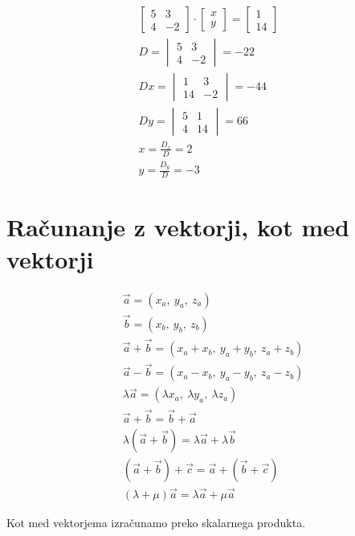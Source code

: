\documentclass[12pt]{report}
\begin{document}
\begin{align*} 
\begin{bmatrix}5 &3 \\  4& -2\end{bmatrix}\cdot
\begin{bmatrix}x\\y \end{bmatrix} = 
\begin{bmatrix}1\\14 \end{bmatrix}\\
D=\begin{vmatrix}5 &3\\4 &-2 \end{vmatrix}=-22\\
Dx=\begin{vmatrix}1 &3\\14 &-2 \end{vmatrix}=-44 \\
Dy=\begin{vmatrix}5 &1\\4 &14 \end{vmatrix}=66\\
x=\frac{D_x}{D} = 2  \\
y=\frac{D_y}{D} = -3
\end{align*}

\section*{Računanje z vektorji, kot med vektorji}

\begin{align*} 
&\vec a = (x_a,\ y_a,\ z_a) \\ 
&\vec b = (x_b,\ y_b,\ z_b) \\ 
& \vec a + \vec b =(x_a+x_b,\ y_a+y_b,\ z_a+z_b) \\ 
& \vec a - \vec b =(x_a-x_b,\ y_a-y_b,\ z_a-z_b) \\ 
&\lambda \vec a = (\lambda x_a,\ \lambda y_a,\ \lambda z_a) \\ 
&\vec a + \vec b = \vec b + \vec a\\ 
& \lambda (\vec a + \vec b) = \lambda \vec a + \lambda \vec b \\ 
&(\vec a + \vec b) + \vec c = \vec a + (\vec b + \vec c) \\
& (\lambda + \mu) \vec a = \lambda \vec a+ \mu \vec a
\end{align*}

Kot med vektorjema izračunamo preko skalarnega produkta.
\end{document}
